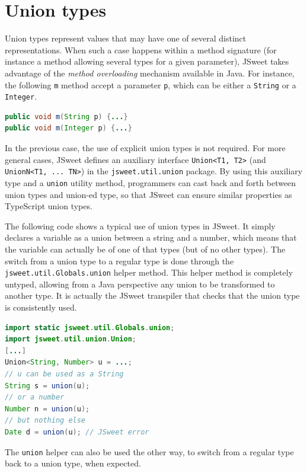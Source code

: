 \documentclass[a4paper]{report}
\begin{document}
\section{Union types}

Union types represent values that may have one of several distinct representations. When such a case happens within a method signature (for instance a method allowing several types for a given parameter), JSweet takes advantage of the \emph{method overloading} mechanism available in Java. For instance, the following \texttt{m} method accept a parameter \texttt{p}, which can be either a \texttt{String} or a \texttt{Integer}.

\begin{lstlisting}[language=Java]
public void m(String p) {...}
public void m(Integer p) {...}
\end{lstlisting}


In the previous case, the use of explicit union types is not required. For more general cases, JSweet defines an auxiliary interface \texttt{Union<T1, T2>} (and \texttt{UnionN<T1, ... TN>}) in the \texttt{jsweet.\-util.\-union} package. By using this auxiliary type and a \texttt{union} utility method, programmers can cast back and forth between union types and union-ed type, so that JSweet can ensure similar properties as TypeScript union types. 

The following code shows a typical use of union types in JSweet. It simply declares a variable as a union between a string and a number, which means that the variable can actually be of one of that types (but of no other types). The switch from a union type to a regular type is done through the \texttt{jsweet\-.util\-.Globals\-.union} helper method. This helper method is completely untyped, allowing from a Java perspective any union to be transformed to another type. It is actually the JSweet transpiler that checks that the union type is consistently used.

\begin{lstlisting}[language=Java]
import static jsweet.util.Globals.union;
import jsweet.util.union.Union;
[...]
Union<String, Number> u = ...;
// u can be used as a String
String s = union(u);
// or a number
Number n = union(u);
// but nothing else
Date d = union(u); // JSweet error
\end{lstlisting}

The \texttt{union} helper can also be used the other way, to switch from a regular type back to a union type, when expected.
\end{document}
